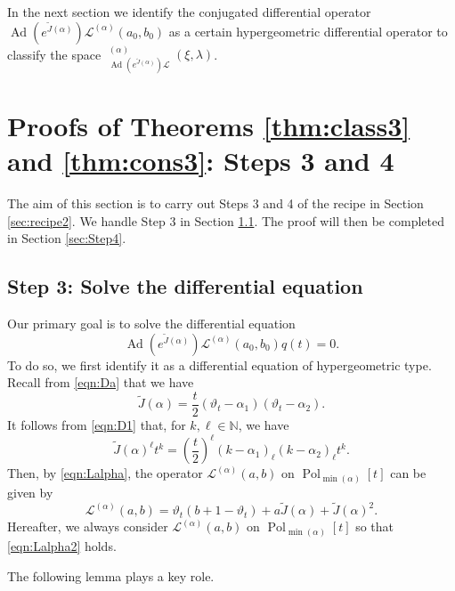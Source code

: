 \documentclass[a4paper,11pt,reqno]{amsart}
\newcommand{\calL}{\mathcal{L}}
\newcommand{\0}{{\bf 0}}
\newcommand{\N}{\mathbb{N}}
\newcommand{\1}{{\bf 1}}
\DeclareMathOperator{\Ad}{Ad}
\DeclareMathOperator{\Pol}{Pol}
\DeclareMathOperator{\Sol}{Sol}
\newcommand{\wJ}{\widetilde{J}}
\DeclareMathOperator{\wSol}{\widetilde{\Sol}}
\theoremstyle{plain}
\theoremstyle{definition}
\numberwithin{equation}{section}
\theoremstyle{definition}
\begin{document}
In the next section we identify the conjugated differential operator
$\Ad(e^{\wJ(\alpha)})\calL^{(\alpha)}(a_0,b_0)$ as 
a certain hypergeometric differential operator
to classify the space $\wSol_{\Ad(e^{\wJ(\alpha)}) \calL}^{(\alpha)}(\xi,\lambda)$.

\section{Proofs of  Theorems \texorpdfstring{\ref{thm:class3}}{6.7} and \texorpdfstring{\ref{thm:cons3}}{6.12}: Steps 3 and 4}
\label{sec:proof2}

The aim of this section is to carry out Steps 3 and 4 of the recipe in Section \ref{sec:recipe2}. 
We handle Step 3 in Section \ref{sec:Step3}. The proof will then be completed in 
Section \ref{sec:Step4}. 

\subsection{Step 3: Solve the differential equation}
\label{sec:Step3}

Our primary goal is to solve the differential equation
\begin{equation*}
\Ad(e^{\wJ(\alpha)})\calL^{(\alpha)}(a_0,b_0)q(t)=0.
\end{equation*}
To do so, we first identify it as a differential equation of hypergeometric type.
Recall from \eqref{eqn:Da} that 
we have 
\begin{equation*}
\wJ(\alpha)=\frac{t}{2}(\vartheta_t-\alpha_1)(\vartheta_t-\alpha_2).
\end{equation*}
It follows from \eqref{eqn:D1} that,
for $k,\ell\in \N$, we have
\begin{equation*}
\wJ(\alpha)^\ell t^k 
=\left(\frac{t}{2}\right)^\ell(k-\alpha_1)_\ell
(k-\alpha_2)_\ell t^k.
\end{equation*}
Then, by \eqref{eqn:Lalpha}, the operator 
$\calL^{(\alpha)}(a,b)$ on $\Pol_{\min(\alpha)}[t]$ can be given by
\begin{equation}\label{eqn:Lalpha2}
\calL^{(\alpha)}(a,b) = 
\vartheta_t(b+1-\vartheta_t)+a\wJ(\alpha)+\wJ(\alpha)^2.
\end{equation}
Hereafter, we always consider $\calL^{(\alpha)}(a,b)$ on $\Pol_{\min(\alpha)}[t]$
so that \eqref{eqn:Lalpha2} holds.

\medskip

The following lemma plays a key role.
\end{document}
